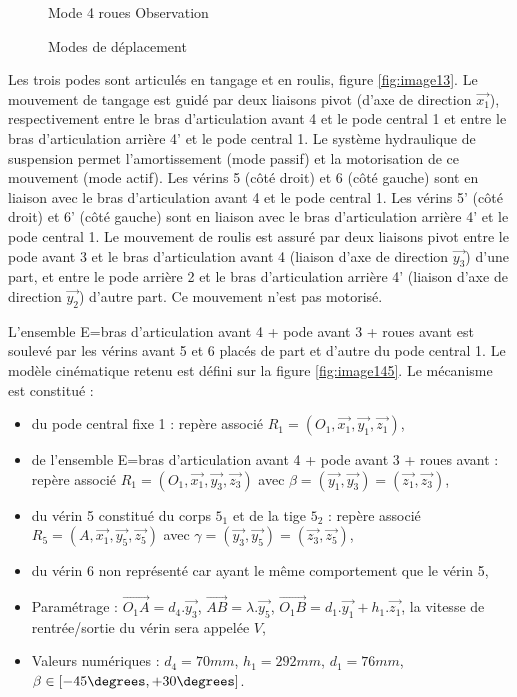 \begin{figure}[htbp]
\begin{minipage}[c]{.32\linewidth}
\begin{center}
Mode 4 roues Observation
\end{center}
\end{minipage}
\caption{Modes de déplacement}
\label{fig:image14}
\end{figure}

Les trois podes sont articulés en tangage et en roulis, figure \ref{fig:image13}. Le mouvement de tangage est guidé par deux liaisons pivot (d'axe de direction $\overrightarrow{x_1}$), respectivement entre le bras d'articulation avant 4 et le pode central 1 et entre le bras d'articulation arrière 4' et le pode central 1. Le système hydraulique de suspension permet l'amortissement (mode passif) et la motorisation de ce mouvement (mode actif). Les vérins 5 (côté droit) et 6 (côté gauche) sont en liaison avec le bras d'articulation avant 4 et le pode central 1. Les vérins 5' (côté droit) et 6' (côté gauche) sont en liaison avec le bras d'articulation arrière 4' et le pode central 1. Le mouvement de roulis est assuré par deux liaisons pivot entre le pode avant 3 et le bras d'articulation avant 4 (liaison d'axe de direction $\overrightarrow{y_3}$) d'une part, et entre le pode arrière 2 et le bras d'articulation arrière 4' (liaison d'axe de direction $\overrightarrow{y_2}$) d'autre part. Ce mouvement n'est pas motorisé. 

L'ensemble E={bras d'articulation avant 4 + pode avant 3 + roues avant} est soulevé par les vérins avant 5 et 6 placés de part et d'autre du pode central 1. Le modèle cinématique retenu est défini sur la figure \ref{fig:image145}. Le mécanisme est constitué :
\begin{itemize}
	\item du pode central fixe 1 : repère associé $R_1=(O_1,\overrightarrow{x_1},\overrightarrow{y_1},\overrightarrow{z_1})$,
	\item de l'ensemble E={bras d'articulation avant 4 + pode avant 3 + roues avant} : repère associé $R_1=(O_1,\overrightarrow{x_1},\overrightarrow{y_3},\overrightarrow{z_3})$ avec $\beta=(\overrightarrow{y_1},\overrightarrow{y_3})=(\overrightarrow{z_1},\overrightarrow{z_3})$,
	\item du vérin 5 constitué du corps $5_1$ et de la tige $5_2$ : repère associé $R_5=(A,\overrightarrow{x_1},\overrightarrow{y_5},\overrightarrow{z_5})$ avec $\gamma=(\overrightarrow{y_3},\overrightarrow{y_5})=(\overrightarrow{z_3},\overrightarrow{z_5})$,
	\item du vérin 6 non représenté car ayant le même comportement que le vérin 5,
	\item Paramétrage : $\overrightarrow{O_1A}=d_4.\overrightarrow{y_3}$, $\overrightarrow{AB}=\lambda.\overrightarrow{y_5}$, $\overrightarrow{O_1B}=d_1.\overrightarrow{y_1}+h_1.\overrightarrow{z_1}$, la vitesse de rentrée/sortie du vérin sera appelée $V$,
	\item Valeurs numériques : $d_4=70mm$, $h_1=292mm$, $d_1=76mm$, $\beta \in \left[-45 \degrees , +30 \degrees\right]$.
\end{itemize}

